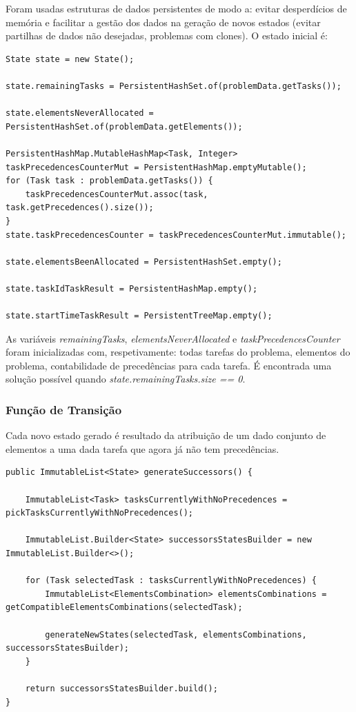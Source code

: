 \documentclass[a4paper,11pt]{article}
\begin{document}
Foram usadas estruturas de dados persistentes de modo a: evitar desperdícios de memória e facilitar a gestão dos dados na geração de novos estados (evitar partilhas de dados não desejadas, problemas com clones). O estado inicial é:

\begin{verbatim}
State state = new State();

state.remainingTasks = PersistentHashSet.of(problemData.getTasks());

state.elementsNeverAllocated = PersistentHashSet.of(problemData.getElements());

PersistentHashMap.MutableHashMap<Task, Integer> taskPrecedencesCounterMut = PersistentHashMap.emptyMutable();
for (Task task : problemData.getTasks()) {
	taskPrecedencesCounterMut.assoc(task, task.getPrecedences().size());
}
state.taskPrecedencesCounter = taskPrecedencesCounterMut.immutable();

state.elementsBeenAllocated = PersistentHashSet.empty();

state.taskIdTaskResult = PersistentHashMap.empty();

state.startTimeTaskResult = PersistentTreeMap.empty();
\end{verbatim}

As variáveis \textit{remainingTasks}, \textit{elementsNeverAllocated} e \textit{taskPrecedencesCounter} foram inicializadas com, respetivamente: todas tarefas do problema, elementos do problema, contabilidade de precedências para cada tarefa. É encontrada uma solução possível quando \textit{state.remainingTasks.size == 0}. 

\subsubsection{Função de Transição}

Cada novo estado gerado é resultado da atribuição de um dado conjunto de elementos a uma dada tarefa que agora já não tem precedências.

\begin{verbatim}
public ImmutableList<State> generateSuccessors() {

	ImmutableList<Task> tasksCurrentlyWithNoPrecedences = pickTasksCurrentlyWithNoPrecedences();

	ImmutableList.Builder<State> successorsStatesBuilder = new ImmutableList.Builder<>();

	for (Task selectedTask : tasksCurrentlyWithNoPrecedences) {
		ImmutableList<ElementsCombination> elementsCombinations = getCompatibleElementsCombinations(selectedTask);
		
		generateNewStates(selectedTask, elementsCombinations, successorsStatesBuilder);
	}

	return successorsStatesBuilder.build();
}
\end{verbatim}
\end{document}
